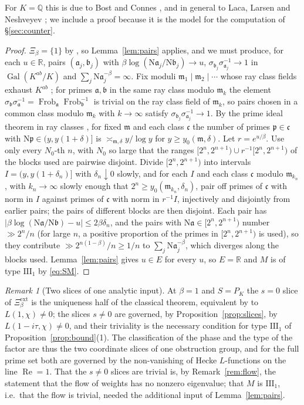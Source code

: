 \documentclass[11pt]{amsart}
\numberwithin{equation}{section}
\theoremstyle{definition}
\theoremstyle{remark}
\newtheorem{remark}[theorem]{Remark}
\newcommand{\Q}{\mathbb{Q}}
\newcommand{\R}{\mathbb{R}}
\newcommand{\pp}{\mathfrak{p}}
\newcommand{\aaa}{\mathfrak{a}}
\newcommand{\bb}{\mathfrak{b}}
\newcommand{\mm}{\mathfrak{m}}
\newcommand{\Ns}{\mathrm{N}}
\newcommand{\Frob}{\operatorname{Frob}}
\newcommand{\Gal}{\operatorname{Gal}}
\newcommand{\Xiext}{\Xi^{\mathrm{ext}}_\beta}
\begin{document}
For $K=\Q$ this is due to Bost and Connes \cite{BC}, and in general to Laca, Larsen and
Neshveyev \cite{LLN}; we include a proof because it is the model for the computation of
\S\ref{sec:counter}.

\begin{proof}
$\Xi_\beta=\{1\}$ by \cite[Cor.~3.10]{Main}, so Lemma~\ref{lem:pairs} applies, and we must
produce, for each $u\in\R$, pairs $(\aaa_j,\bb_j)$ with $\beta\log(\Ns\aaa_j/\Ns\bb_j)\to u$,
$\sigma_{\bb_j}\sigma_{\aaa_j}^{-1}\to1$ in $\Gal(K^{ab}/K)$ and $\sum_j\Ns\aaa_j^{-\beta}=\infty$.
Fix moduli $\mm_1\mid\mm_2\mid\cdots$ whose ray class fields exhaust $K^{ab}$
\cite[Ch.~VI]{Neu}; for primes
$\aaa,\bb$ in the same ray class modulo $\mm_k$ the element
$\sigma_\bb\sigma_\aaa^{-1}=\Frob_\aaa\Frob_\bb^{-1}$ is trivial on the ray class field of
$\mm_k$, so pairs chosen in a common class modulo $\mm_{k}$ with $k\to\infty$ satisfy
$\sigma_{\bb_j}\sigma_{\aaa_j}^{-1}\to1$. By the prime ideal theorem in ray classes
\cite{Landau}, for fixed $\mm$ and each class $\mathfrak c$ the number of primes
$\pp\in\mathfrak c$ with $\Ns\pp\in(y,y(1+\delta)]$ is $\asymp_{\mm,\delta}y/\log y$ for
$y\ge y_0(\mm,\delta)$. Let $r=e^{u/\beta}$. Use only every $N_0$-th $n$, with $N_0$ so large that the ranges
$[2^n,2^{n+1})\cup r^{-1}[2^n,2^{n+1})$ of the blocks used are pairwise disjoint. Divide
$[2^n,2^{n+1})$ into intervals $I=(y,y(1+\delta_n)]$ with $\delta_n\downarrow0$ slowly, and
for each $I$ and each class
$\mathfrak c$ modulo $\mm_{k_n}$, with $k_n\to\infty$ slowly enough that
$2^n\ge y_0(\mm_{k_n},\delta_n)$, pair off primes of $\mathfrak c$ with norm in $I$ against
primes of $\mathfrak c$ with norm in $r^{-1}I$, injectively and disjointly from earlier
pairs; the pairs of different blocks are then disjoint. Each pair has
$|\beta\log(\Ns\aaa/\Ns\bb)-u|\le2\beta\delta_n$, and the pairs with
$\Ns\aaa\in[2^n,2^{n+1})$ number $\gg2^n/n$ (for large $n$, a positive proportion of the primes
in $[2^n,2^{n+1})$ is used), so they contribute $\gg2^{n(1-\beta)}/n\ge1/n$ to
$\sum_j\Ns\aaa_j^{-\beta}$, which diverges along the blocks used. Lemma~\ref{lem:pairs} gives $u\in E$
for every $u$, so $E=\R$ and $M$ is of type $\mathrm{III}_1$ by \eqref{eq:SM}.
\end{proof}

\begin{remark}[Two slices of one analytic input]\label{rem:unify}
At $\beta=1$ and $S=P_K$ the $s=0$ slice of $\Xiext$ is the uniqueness half of the classical
theorem, equivalent by \cite[Rem.~3.11]{Main} to $L(1,\chi)\ne0$; the slices $s\ne0$ are
governed, by Proposition~\ref{prop:slices}, by $L(1-i\tau,\chi)\ne0$, and their triviality
is the necessary condition for type $\mathrm{III}_1$ of Proposition~\ref{prop:bound}(1).
The classification of the phase and the type of the factor are thus the two coordinate
slices of one obstruction group, and for the full prime set both are governed by the
non-vanishing of Hecke $L$-functions on the line $\operatorname{Re}=1$. That the
$s\ne0$ slices are trivial is, by Remark~\ref{rem:flow}, the statement that the flow of
weights has no nonzero eigenvalue; that $M$ is $\mathrm{III}_1$, i.e.\ that the flow is
trivial, needed the additional input of Lemma~\ref{lem:pairs}.
\end{remark}
\end{document}
